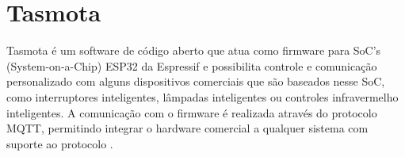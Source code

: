 \section{Tasmota}
Tasmota é um software de código aberto que atua como firmware para SoC’s (System-on-a-Chip) ESP32 
da Espressif e possibilita controle e comunicação personalizado com alguns dispositivos comerciais que são 
baseados nesse SoC, como interruptores inteligentes, lâmpadas inteligentes ou controles infravermelho
inteligentes.
A comunicação com o firmware é realizada através do protocolo MQTT, permitindo integrar o hardware comercial
a qualquer sistema com suporte ao protocolo \cite{tasmota-1}.



